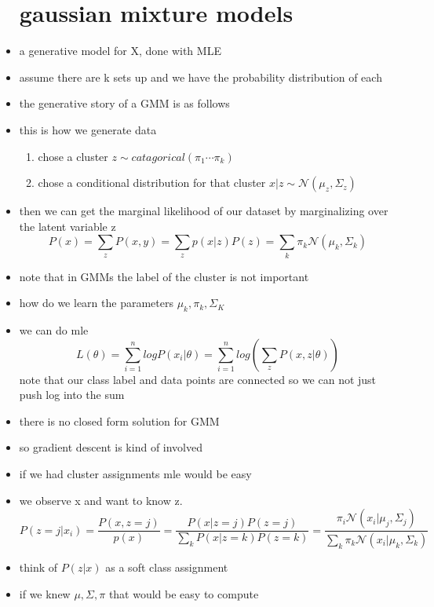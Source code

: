 \documentclass{article}
\begin{document}
\begin{itemize}
\section*{gaussian mixture models}
\item a generative model for X, done with MLE
\item assume there are k sets up and we have the probability distribution of each 
\item the generative story of a GMM is as follows
\item this is how we generate data 
\begin{enumerate}
    \item chose a cluster $z\sim catagorical(\pi_1\cdots \pi_{k})$
    \item chose a conditional distribution for that cluster $x|z\sim \mathcal{N}(\mu_{z},\Sigma_{z})$
\end{enumerate}
\item then we can get the marginal likelihood of our dataset by marginalizing over the latent variable z $$P(x)=\sum_{z}P(x,y)=\sum_{z}p(x|z)P(z)=\sum_{k}\pi_{k}\mathcal{N}(\mu_{k}, \Sigma_k)$$
\item note that in GMMs the label of the cluster is not important 
\item how do we learn the parameters $\mu_{k}, \pi_{k}, \Sigma_{K}$
\item we can do mle $$L(\theta)=\sum_{i=1}^{n}logP(x_{i}|\theta)=\sum_{i=1}^{n}log(\sum_{z}P(x,z|\theta))$$ note that our class label and data points are connected so we can not just push log into the sum 
\item there is no closed form solution for GMM
\item so gradient descent is kind of involved
\item if we had cluster assignments mle would be easy 
\item we observe x and want to know z. $$P(z=j|x_i)=\frac{P(x,z=j)} {p(x)}=\frac{P(x|z=j)P(z=j)}{\sum_{k}P(x|z=k)P(z=k)}=\frac{\pi_{i}\mathcal{N}(x_i|\mu_{j},\Sigma_{j})}{\sum_{k}\pi_{k}\mathcal{N}(x_i|\mu_{k},\Sigma_{k})}$$
\item think of $P(z|x)$ as a soft class assignment 
\item if we knew $\mu, \Sigma, \pi$ that would be easy to compute

\end{itemize}
\end{document}
